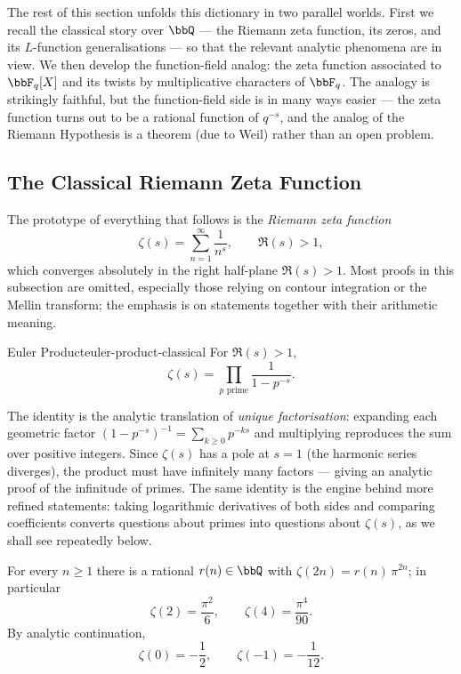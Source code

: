 The rest of this section unfolds this dictionary in two parallel worlds. First we recall the classical story over $\bbQ$ --- the Riemann zeta function, its zeros, and its $L$-function generalisations --- so that the relevant analytic phenomena are in view. We then develop the function-field analog: the zeta function associated to $\bbF_q[X]$ and its twists by multiplicative characters of $\bbF_q$. The analogy is strikingly faithful, but the function-field side is in many ways easier --- the zeta function turns out to be a rational function of $q^{-s}$, and the analog of the Riemann Hypothesis is a theorem (due to Weil) rather than an open problem.

\subsection{The Classical Riemann Zeta Function}
The prototype of everything that follows is the \emph{Riemann zeta function}
$$\zeta(s)=\sum_{n=1}^{\infty}\frac{1}{n^s}, \qquad \Re(s)>1,$$
which converges absolutely in the right half-plane $\Re(s)>1$. Most proofs in this subsection are omitted, especially those relying on contour integration or the Mellin transform; the emphasis is on statements together with their arithmetic meaning.

\begin{Theorem}{Euler Product}{euler-product-classical}
  For $\Re(s)>1$,
  $$\zeta(s)=\prod_{p\text{ prime}}\frac{1}{1-p^{-s}}.$$
\end{Theorem}

The identity is the analytic translation of \emph{unique factorisation}: expanding each geometric factor $(1-p^{-s})^{-1}=\sum_{k\geq 0}p^{-ks}$ and multiplying reproduces the sum over positive integers. Since $\zeta(s)$ has a pole at $s=1$ (the harmonic series diverges), the product must have infinitely many factors --- giving an analytic proof of the infinitude of primes. The same identity is the engine behind more refined statements: taking logarithmic derivatives of both sides and comparing coefficients converts questions about primes into questions about $\zeta(s)$, as we shall see repeatedly below.

\begin{observation}
  For every $n\geq 1$ there is a rational $r(n)\in\bbQ$ with $\zeta(2n)=r(n)\,\pi^{2n}$; in particular
  $$\zeta(2)=\frac{\pi^2}{6}, \qquad \zeta(4)=\frac{\pi^4}{90}.$$
  By analytic continuation,
  $$\zeta(0)=-\frac{1}{2}, \qquad \zeta(-1)=-\frac{1}{12}.$$
\end{observation}

